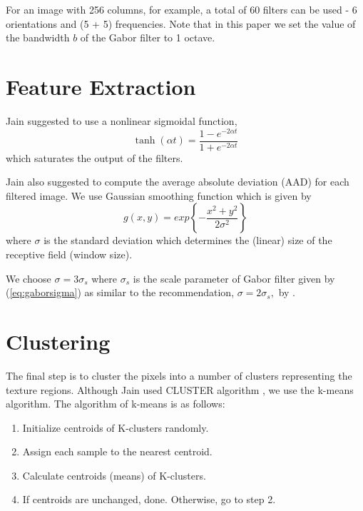 \documentclass[article,oneside]{memoir}
\begin{document}
For an image with 256 columns, for example, a total of 60 filters can be used - 6 orientations and (5 + 5) frequencies. 
Note that in this paper we set the value of the bandwidth $b$ of the Gabor filter to 1 octave. 

\section{Feature Extraction}

Jain \cite{Jain} suggested to use a nonlinear sigmoidal function, 
\begin{equation}
\tanh(\alpha t) = \frac{1 - e^{-2 \alpha t}}{1 + e^{-2 \alpha t}}
\end{equation}
which saturates the output of the filters. 

Jain \cite{Jain} also suggested to compute the average absolute deviation (AAD) for each filtered image. 
We use Gaussian smoothing function which is given by
\begin{equation}
g(x,y) =  exp \left\{  - \frac{x^2 + y^2 }{2 \sigma^2} \right\}
\end{equation}
where $ \sigma  $  is the standard deviation which determines the (linear) size of the receptive field (window size). 

We choose $ \sigma = 3 \sigma_s $ where  $ \sigma_s$ is the scale parameter of Gabor filter given by (\ref{eq:gaborsigma}) as similar to the recommendation, $ \sigma  = 2 \sigma_s, $ by \cite{Zhang}. 

\section{Clustering}

The final step is to cluster the pixels into a number of clusters representing the texture regions. Although Jain used CLUSTER algorithm \cite{Jain}, we use the k-means algorithm. 
The algorithm of k-means is as follows:
\begin{enumerate}
\item Initialize centroids of K-clusters randomly.
\item Assign each sample to the nearest centroid.
\item Calculate centroids (means) of K-clusters.
\item If centroids are unchanged, done. Otherwise, go to step 2.
\end{enumerate}
\end{document}
